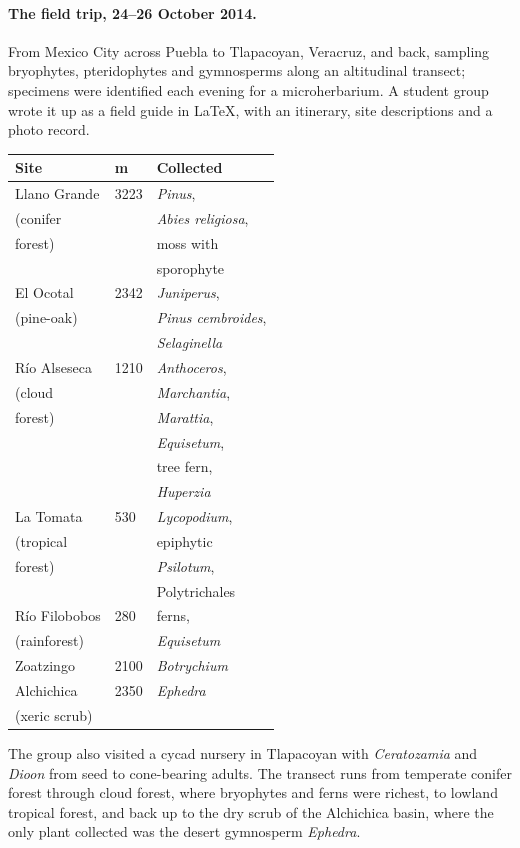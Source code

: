 \paragraph{The field trip, 24--26 October
2014.} From Mexico City across Puebla to
Tlapacoyan, Veracruz, and back, sampling
bryophytes, pteridophytes and gymnosperms
along an altitudinal transect; specimens
were identified each evening for a
microherbarium. A student group wrote it up
as a field guide in LaTeX, with an
itinerary, site descriptions and a photo
record.
\begin{center}
\begin{tabular}{lll}
Site & m & Collected \\
\hline
Llano Grande & 3223 & \emph{Pinus}, \\
(conifer & & \emph{Abies religiosa}, \\
forest) & & moss with \\
& & sporophyte \\
El Ocotal & 2342 & \emph{Juniperus}, \\
(pine-oak) & & \emph{Pinus cembroides}, \\
& & \emph{Selaginella} \\
R\'io Alseseca & 1210 & \emph{Anthoceros}, \\
(cloud & & \emph{Marchantia}, \\
forest) & & \emph{Marattia}, \\
& & \emph{Equisetum}, \\
& & tree fern, \\
& & \emph{Huperzia} \\
La Tomata & 530 & \emph{Lycopodium}, \\
(tropical & & epiphytic \\
forest) & & \emph{Psilotum}, \\
& & Polytrichales \\
R\'io Filobobos & 280 & ferns, \\
(rainforest) & & \emph{Equisetum} \\
Zoatzingo & 2100 & \emph{Botrychium} \\
Alchichica & 2350 & \emph{Ephedra} \\
(xeric scrub) & & \\
\end{tabular}
\end{center}
The group also visited a cycad nursery in
Tlapacoyan with \emph{Ceratozamia} and
\emph{Dioon} from seed to cone-bearing
adults. The transect runs from temperate
conifer forest through cloud forest, where
bryophytes and ferns were richest, to
lowland tropical forest, and back up to the
dry scrub of the Alchichica basin, where
the only plant collected was the
desert gymnosperm \emph{Ephedra}.

